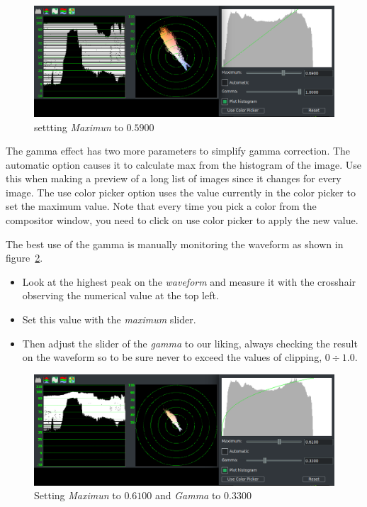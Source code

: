 \begin{figure}[htpb]
    \centering
    \includegraphics[width=1.0\linewidth]{images/gamma01.png}
    \caption{settting \textit{Maximun} to $0.5900$}
    \label{fig:gamma01}
\end{figure}

The gamma effect has two more parameters to simplify gamma correction. The automatic option causes it to calculate max from the histogram of the image. Use this when making a preview of a long list of images since it changes for every image. The use color picker option uses the value currently in the color picker to set the maximum value. Note that every time you pick a color from the compositor window, you need to click on use color picker to apply the new value.

The best use of the gamma is manually monitoring the waveform as shown in figure~\ref{fig:gamma02}.

\begin{itemize}
    \item Look at the highest peak on the \textit{waveform} and measure it with the crosshair observing the numerical value at the top left.
    \item Set this value with the \textit{maximum} slider.
    \item Then adjust the slider of the \textit{gamma} to our liking, always checking the result on the waveform so to be sure never to exceed the values of clipping, $0 \div 1.0$.
\end{itemize}

\begin{figure}[htpb]
    \centering
    \includegraphics[width=1.0\linewidth]{images/gamma02.png}
    \caption{Setting \textit{Maximun} to $0.6100$ and \textit{Gamma} to $0.3300$}
    \label{fig:gamma02}
\end{figure}

